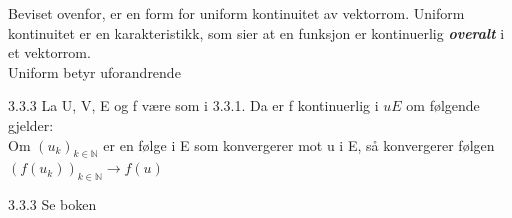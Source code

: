 \documentclass[a4paper,norsk]{article}
\begin{document}
Beviset ovenfor, er en form for uniform kontinuitet av vektorrom. Uniform kontinuitet er en karakteristikk, som sier at en funksjon er kontinuerlig \textbf{\textit{overalt}} i et vektorrom. \\

Uniform betyr uforandrende


\begin{propositionbox}{3.3.3}{}
La U, V, E og f være som i 3.3.1. Da er f kontinuerlig i $ u E $ om følgende gjelder:\\

Om $ \left( u_k \right) _{k \in \mathbb{N}} $ er en følge i E som konvergerer mot u i E, så konvergerer følgen $ \left( f(u_k) \right) _{k \in  \mathbb{N}} \to f(u)$ 
\begin{proofbox}{3.3.3}{}
    Se boken
\end{proofbox}
\end{propositionbox}
\end{document}
